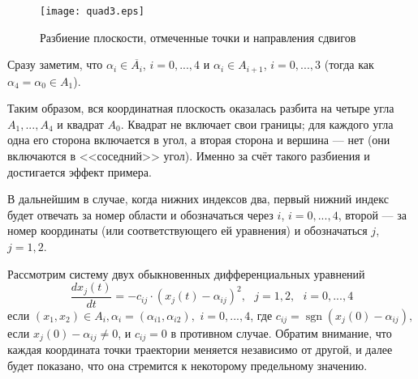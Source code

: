 \begin{figure}[h]
	\centering
	\texttt{[image: quad3.eps]}
	\caption{Разбиение плоскости, отмеченные точки и направления сдвигов}
	\label{fig:somelabel}
\end{figure}

Сразу заметим, что $\alpha_i \in \overline{A_i}$, $i=0,...,4$ и
$\alpha_i \in A_{i+1}$, $i=0,...,3$ (тогда как $\alpha_4 = \alpha_0 \in A_{1}$).

Таким образом, вся координатная плоскость оказалась разбита на четыре угла $A_1, ..., A_4$ и квадрат $A_0$.
Квадрат не включает свои границы; для каждого угла одна его сторона включается в угол,
а вторая сторона и вершина --- нет (они включаются в <<соседний>> угол).
Именно за счёт такого разбиения и достигается эффект примера.

В дальнейшим в случае, когда нижних индексов два, первый нижний индекс
будет отвечать за номер области и обозначаться через $i$,
$i=0, ..., 4$, второй --- за номер координаты
(или соответствующего ей уравнения) и обозначаться $j$, $j=1, 2$.

Рассмотрим систему двух обыкновенных дифференциальных уравнений
\begin{equation}\label{difur_primer_R2}
	\frac{dx_j(t)}{dt} = -c_{ij} \cdot (x_j(t)-\alpha_{ij})^2, \mbox{~~} j=1,2, \mbox{~~} i=0,...,4
\end{equation}
если
$
	(x_1, x_2) \in A_i,  \alpha_i = (\alpha_{i1},\alpha_{i2}),
$
$i=0,...,4$,
где
$
	c_{ij} = \operatorname{sgn}(x_j(0)-\alpha_{ij}),
$
если $x_j(0) - \alpha_{ij} \neq 0$,
и $c_{ij} = 0$ в противном случае.
Обратим внимание, что каждая координата точки траектории меняется независимо от другой,
и далее будет показано, что она стремится
к некоторому предельному значению.

